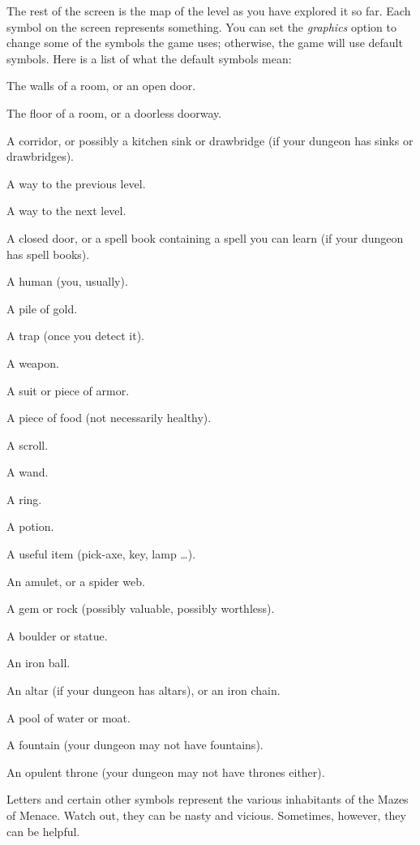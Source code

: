 The rest of the screen is the map of the level as you have explored it
so far.  Each symbol on the screen represents something.  You can set
the
{\it graphics\/}
option to change some of the symbols the game uses; otherwise, the
game will use default symbols.  Here is a list of what the default
symbols mean:

\blist{}
\item[\tb{- and |}]
The walls of a room, or an open door.
\item[\tb{.}]
The floor of a room, or a doorless doorway.
\item[\tb{\#}]
A corridor, or possibly a kitchen sink or drawbridge (if your dungeon
has sinks or drawbridges).
\item[\tb{<}]
A way to the previous level.
\item[\tb{>}]
A way to the next level.
\item[\tb{+}]
A closed door, or a spell book containing a spell you can learn (if your
dungeon has spell books).
\item[\tb{@}]
A human (you, usually).
\item[\tb{\$}]
A pile of gold.
\item[\tb{\^}]
A trap (once you detect it).
\item[\tb{)}]
A weapon.
\item[\tb{[}]
A suit or piece of armor.
\item[\tb{\%}]
A piece of food (not necessarily healthy).
\item[\tb{?}]
A scroll.
\item[\tb{/}]
A wand.
\item[\tb{=}]
A ring.
\item[\tb{!}]
A potion.
\item[\tb{(}]
A useful item (pick-axe, key, lamp \ldots).
\item[\tb{"}]
An amulet, or a spider web.
\item[\tb{*}]
A gem or rock (possibly valuable, possibly worthless).
\item[\tb{`}]
A boulder or statue.
\item[\tb{0}]
An iron ball.
\item[\tb{_}]
An altar (if your dungeon has altars), or an iron chain.
\item[\tb{\}}]
A pool of water or moat.
\item[\tb{\{}]
A fountain (your dungeon may not have fountains).
\item[\tb{$\backslash$}]
An opulent throne (your dungeon may not have thrones either).
\item[\tb{a-zA-Z \& other symbols}]
Letters and certain other symbols represent the various inhabitants
of the Mazes of Menace.  Watch out, they can be nasty and vicious.
Sometimes, however, they can be helpful.

